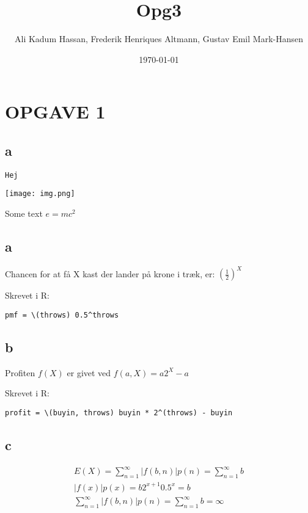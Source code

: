 \documentclass[11pt]{article}
\author{Ali Kadum Hassan, Frederik Henriques Altmann, Gustav Emil Mark-Hansen}
\date{\today}
\title{Opg3}
\begin{document}
\maketitle
\tableofcontents


\section{OPGAVE 1}
\label{sec:orgf48354d}

\subsection{a}
\label{sec:orgb649a2b}
\begin{verbatim}
Hej
\end{verbatim}

\begin{center}
\texttt{[image: img.png]}
\end{center}

Some text
\(e = mc^2\)

\subsection{a}
\label{sec:org40031ec}
Chancen for at få X kast der lander på krone i træk, er:
\((\frac{1}{2})^X\)

Skrevet i R:
\begin{verbatim}
pmf = \(throws) 0.5^throws
\end{verbatim}
\subsection{b}
\label{sec:org9daf217}
Profiten \(f(X)\) er givet ved \(f(a, X) = a2^X - a\)

Skrevet i R:
\begin{verbatim}
profit = \(buyin, throws) buyin * 2^(throws) - buyin
\end{verbatim}
\subsection{c}
\label{sec:org450d4c2}
\begin{align}
E(X) = \sum_{n=1}^\infty |f(b,n)|p(n) = \sum_{n=1}^\infty b \\
|f(x)|p(x) = b2^{x+1}0.5^x = b \\
\sum_{n=1}^\infty |f(b,n)|p(n) = \sum_{n=1}^\infty b = \infty
\end{align}
\end{document}

